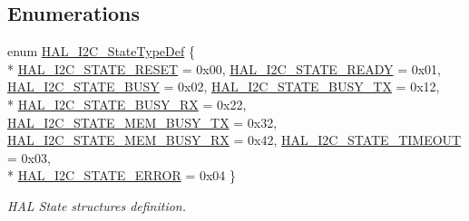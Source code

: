 \subsection*{Enumerations}
\begin{DoxyCompactItemize}
\item 
enum \hyperlink{group___i2_c___exported___types_gaef355af8eab251ae2a19ee164ad81c37}{H\+A\+L\+\_\+\+I2\+C\+\_\+\+State\+Type\+Def} \{ \\*
\hyperlink{group___i2_c___exported___types_ggaef355af8eab251ae2a19ee164ad81c37a91ba08634e08d7287940f1bc5a37eeff}{H\+A\+L\+\_\+\+I2\+C\+\_\+\+S\+T\+A\+T\+E\+\_\+\+R\+E\+S\+ET} = 0x00, 
\hyperlink{group___i2_c___exported___types_ggaef355af8eab251ae2a19ee164ad81c37af859ce60c5e462b0bfde3a5010bc72d1}{H\+A\+L\+\_\+\+I2\+C\+\_\+\+S\+T\+A\+T\+E\+\_\+\+R\+E\+A\+DY} = 0x01, 
\hyperlink{group___i2_c___exported___types_ggaef355af8eab251ae2a19ee164ad81c37a0c503d6c0388f0d872b368557e278b5a}{H\+A\+L\+\_\+\+I2\+C\+\_\+\+S\+T\+A\+T\+E\+\_\+\+B\+U\+SY} = 0x02, 
\hyperlink{group___i2_c___exported___types_ggaef355af8eab251ae2a19ee164ad81c37acb3a9e3d4d1076e0f4e65f91ca0161bc}{H\+A\+L\+\_\+\+I2\+C\+\_\+\+S\+T\+A\+T\+E\+\_\+\+B\+U\+S\+Y\+\_\+\+TX} = 0x12, 
\\*
\hyperlink{group___i2_c___exported___types_ggaef355af8eab251ae2a19ee164ad81c37a4ea4ecc2dc3cb64c4877c123d9d73170}{H\+A\+L\+\_\+\+I2\+C\+\_\+\+S\+T\+A\+T\+E\+\_\+\+B\+U\+S\+Y\+\_\+\+RX} = 0x22, 
\hyperlink{group___i2_c___exported___types_ggaef355af8eab251ae2a19ee164ad81c37a066fa01c246e6663566170f251233d0d}{H\+A\+L\+\_\+\+I2\+C\+\_\+\+S\+T\+A\+T\+E\+\_\+\+M\+E\+M\+\_\+\+B\+U\+S\+Y\+\_\+\+TX} = 0x32, 
\hyperlink{group___i2_c___exported___types_ggaef355af8eab251ae2a19ee164ad81c37ace78b825fa91b289f6414faab26c0f5f}{H\+A\+L\+\_\+\+I2\+C\+\_\+\+S\+T\+A\+T\+E\+\_\+\+M\+E\+M\+\_\+\+B\+U\+S\+Y\+\_\+\+RX} = 0x42, 
\hyperlink{group___i2_c___exported___types_ggaef355af8eab251ae2a19ee164ad81c37a378abf24301fe7a23620fd78ff3f168b}{H\+A\+L\+\_\+\+I2\+C\+\_\+\+S\+T\+A\+T\+E\+\_\+\+T\+I\+M\+E\+O\+UT} = 0x03, 
\\*
\hyperlink{group___i2_c___exported___types_ggaef355af8eab251ae2a19ee164ad81c37afe3c9b304462901099426a0d414be2a2}{H\+A\+L\+\_\+\+I2\+C\+\_\+\+S\+T\+A\+T\+E\+\_\+\+E\+R\+R\+OR} = 0x04
 \}\begin{DoxyCompactList}\small\item\em H\+AL State structures definition. \end{DoxyCompactList}
\end{DoxyCompactItemize}


